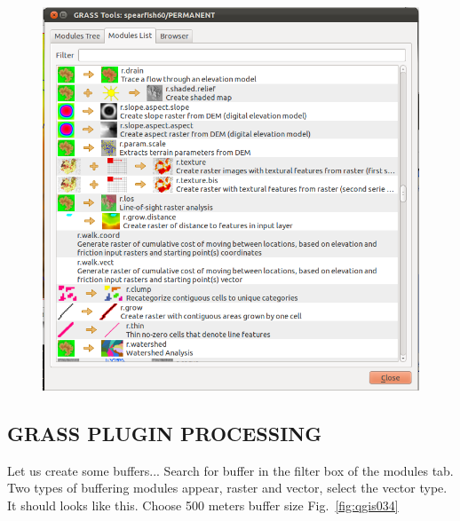 \begin{figure}[htbp]
   \centering
   \includegraphics[scale=0.25]{qgis033.png}
   \caption{}
   \label{fig:qgis033}
\end{figure}

\subsection{GRASS PLUGIN PROCESSING}

Let us create some buffers... Search for buffer in the filter box of the modules tab. Two types of buffering modules appear, raster and vector, select the vector type. It should looks like this. Choose 500 meters buffer
size Fig.~\ref{fig:qgis034}

